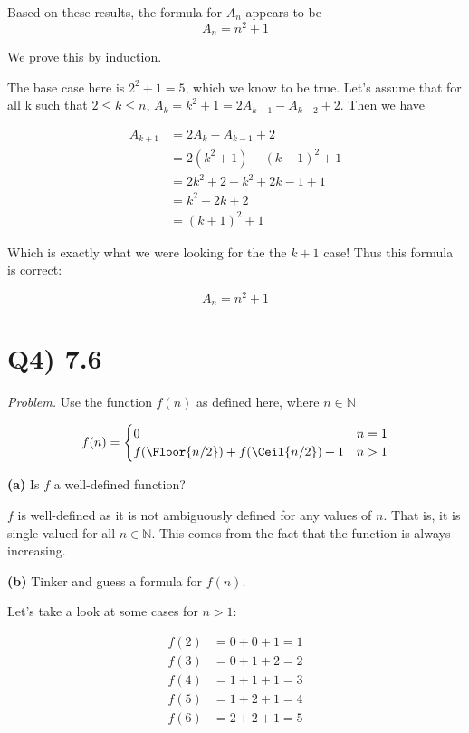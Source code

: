 \documentclass{article}
\DeclarePairedDelimiter\Floor\lfloor\rfloor
\DeclarePairedDelimiter\Ceil\lceil\rceil
\begin{document}
Based on these results, the formula for $A_n$ appears to be $$A_n = n^2 + 1$$

We prove this by induction.

The base case here is $2^2 + 1 = 5$, which we know to be true. Let's assume that for all k such that $2 \leq k \leq n$, $A_k = k^2 + 1 = 2A_{k-1} - A_{k-2} + 2$. Then we have

\begin{align*}
  A_{k+1} &= 2A_k - A_{k-1} + 2 \\
  &= 2(k^2+1) - (k-1)^2 + 1 \\
  &= 2k^2 + 2 - k^2 + 2k - 1 + 1 \\
  &= k^2 + 2k + 2 \\
  &= (k+1)^2 + 1
\end{align*}

Which is exactly what we were looking for the the $k+1$ case! Thus this formula is correct:

$$A_n = n^2 + 1$$

\section*{Q4) 7.6}
\textit{Problem.} Use the function $f(n)$ as defined here, where $n \in \mathbb{N}$

\[
  f(n) =
  \begin{cases}
    0 & n = 1 \\
    f(\Floor{n/2}) + f(\Ceil{n/2}) + 1 & n > 1
  \end{cases}
\]

\noindent\textbf{(a)} Is $f$ a well-defined function?

$f$ is well-defined as it is not ambiguously defined for any values of $n$. That is, it is single-valued for all $n \in \mathbb{N}$. This comes from the fact that the function is always increasing.

\smallskip

\noindent\textbf{(b)} Tinker and guess a formula for $f(n)$.

Let's take a look at some cases for $n > 1$:

\begin{align*}
  f(2) &= 0 + 0 + 1 = 1 \\
  f(3) &= 0 + 1 + 2 = 2 \\
  f(4) &= 1 + 1 + 1 = 3 \\
  f(5) &= 1 + 2 + 1 = 4 \\
  f(6) &= 2 + 2 + 1 = 5
\end{align*}
\end{document}
